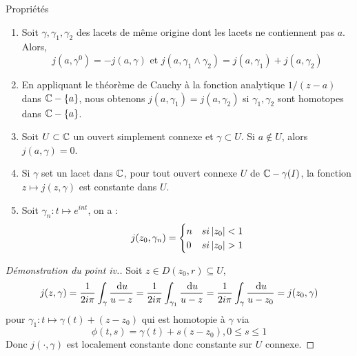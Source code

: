 \documentclass{cours}
\begin{document}
\begin{propositionfr}{Propriétés}{}
    \begin{enumerate}
        \item Soit $\gamma, \gamma_{1}, \gamma_{2}$ des lacets de même origine dont les lacets ne contiennent pas $a$. Alors,
        \[
            j(a, \gamma^{0}) = -j(a, \gamma) \text{ et } j(a, \gamma_{1} \land \gamma_{2}) = j(a, \gamma_{1}) + j(a, \gamma_{2})
        \]
        \item En appliquant le théorème de Cauchy à la fonction analytique $1/(z - a)$ dans $\mathbb{C} - \{a\}$, nous obtenons $j(a, \gamma_{1}) = j(a, \gamma_{2})$ si $\gamma_{1}, \gamma_{2}$ sont homotopes dans $\mathbb{C} - \{a\}$.
        \item Soit $U \subset \mathbb{C}$ un ouvert simplement connexe et $\gamma \subset U$. Si $a \notin U$, alors $j(a, \gamma) = 0$.
        \item Si $\gamma$ set un lacet dans $\mathbb{C}$, pour tout ouvert connexe $U$ de $\mathbb{C} - \gamma(I)$, la fonction $z \mapsto j(z, \gamma)$ est constante dans $U$.
        \item Soit $\gamma_{n} : t \mapsto e^{int}$, on a : 
        \[
            j(z_{0}, \gamma_{n}) = \begin{cases}
                n & si \left|z_{0}\right| < 1\\
                0 & si \left|z_{0}\right| > 1
            \end{cases}
        \]
    \end{enumerate}
\end{propositionfr}
\begin{proof}[Démonstration du point iv.]
    Soit $z \in D(z_{0}, r) \subseteq U$, 
    \[
        j(z, \gamma) = \frac{1}{2i\pi}\int_{\gamma}\frac{{\rm \, d} u}{u - z} = \frac{1}{2i\pi}\int_{\gamma_{1}}\frac{{\rm \, d} u}{u - z} = \frac{1}{2i\pi}\int_{\gamma}\frac{{\rm \, d} u}{u - z_{0}} = j(z_{0}, \gamma)
    \]
    pour $\gamma_{1} : t \mapsto \gamma(t) + (z - z_{0})$ qui est homotopie à $\gamma$ via 
    \[
        \phi(t, s) = \gamma(t) + s(z - z_{0}), 0 \leq s \leq 1
    \]
    Donc $j(\cdot, \gamma)$ est localement constante donc constante sur $U$ connexe. 
\end{proof}
\end{document}
